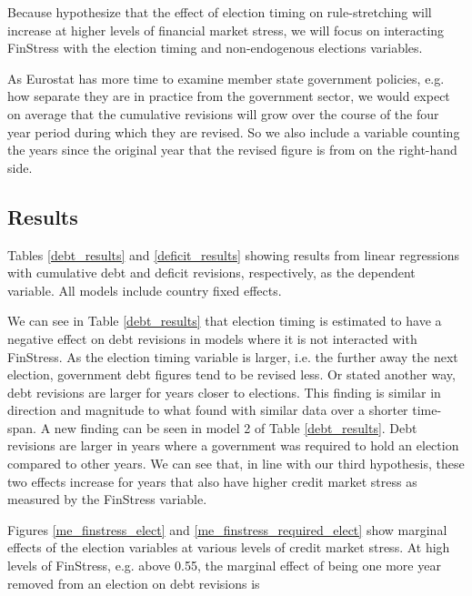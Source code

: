 \documentclass[]{article}
\begin{document}
Because hypothesize that the effect of election timing on rule-stretching will increase at higher levels of financial market stress, we will focus on interacting FinStress with the election timing and non-endogenous elections variables.

As Eurostat has more time to examine member state government policies, e.g. how separate they are in practice from the government sector, we would expect on average that the cumulative revisions will grow over the course of the four year period during which they are revised. So we also include a variable counting the years since the original year that the revised figure is from on the right-hand side.





\subsection{Results}

Tables \ref{debt_results} and \ref{deficit_results} showing results from linear regressions with cumulative debt and deficit revisions, respectively, as the dependent variable. All models include country fixed effects.

We can see in Table \ref{debt_results} that election timing is estimated to have a negative effect on debt revisions in models where it is not interacted with FinStress. As the election timing variable is larger, i.e. the further away the next election, government debt figures tend to be revised less. Or stated another way, debt revisions are larger for years closer to elections. This finding is similar in direction and magnitude to what \cite{DeCastro2013} found with similar data over a shorter time-span. A new finding can be seen in model 2 of Table \ref{debt_results}. Debt revisions are larger in years where a government was required to hold an election compared to other years. We can see that, in line with our third hypothesis, these two effects increase for years that also have higher credit market stress as measured by the FinStress variable.

Figures \ref{me_finstress_elect} and \ref{me_finstress_required_elect} show marginal effects of the election variables at various levels of credit market stress. At high levels of FinStress, e.g. above 0.55, the marginal effect of being one more year removed from an election on debt revisions is
\end{document}
